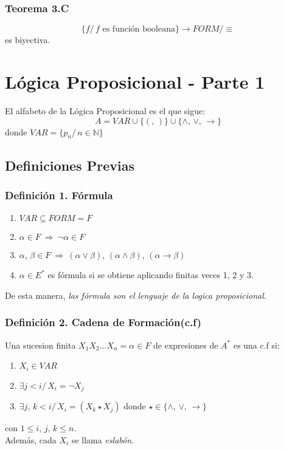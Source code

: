 \documentclass{article}
\newcommand{\comma}{,\,}                                %
\newcommand{\tq}{/\,}                                   %
\newcommand{\naturales}{\mathbb{N}}                     %
\newcommand{\Rightarrows}{\: \Rightarrow \:}            %
\begin{document}
\subsubsection{Teorema 3.C}
\begin{equation*}
    \{f \tq f \text{ es función booleana}\} \rightarrow FORM/\equiv
\end{equation*}
es biyectiva.

\newpage
\section{Lógica Proposicional - Parte 1}
El alfabeto de la Lógica Proposicional es el que sigue:
\begin{equation*}
	A = VAR \cup \{ ( \comma ) \} \cup \{ \wedge \comma \vee \comma \rightarrow \}
\end{equation*}
donde $VAR = \{ p_n \tq n \in \naturales \} $

\subsection{Definiciones Previas}
\subsubsection*{Definición 1. Fórmula}
\begin{enumerate}
	\item $VAR \subseteq FORM = F$
	\item $\alpha \in F \Rightarrows \neg \alpha \in F$
	\item $\alpha \comma \beta \in F \Rightarrows (\alpha \vee \beta) \comma (\alpha \wedge \beta) 
		\comma (\alpha \rightarrow \beta)$
	\item $\alpha \in E^*$ es fórmula si se obtiene aplicando finitas veces 1, 2 y 3.
\end{enumerate}
De esta manera, \emph{las fórmula son el lenguaje de la logica proposicional}.

\subsubsection*{Definición 2. Cadena de Formación(c.f)}
Una sucesion finita $X_1 X_2 ... X_n = \alpha \in F$ de expresiones de $A^*$ es una c.f si:
\begin{enumerate}
	\item $X_i \in VAR$
	\item $\exists j < i \tq X_i = \neg X_j$
	\item $\exists j \comma k < i \tq X_i = (X_k \star X_j)$ donde $\star \in 
		\{ \wedge \comma \vee \comma \rightarrow \}$
\end{enumerate}
con $1 \leq i \comma j \comma k \leq n$.
\\Además, cada $X_i$ se llama \emph{eslabón}.
\end{document}
